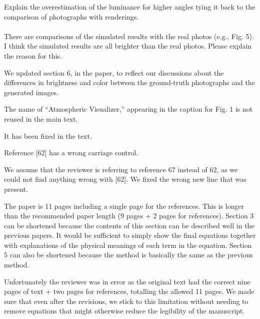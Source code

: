 \documentclass{article}
\begin{document}
\vspace*{1cm}
\begin{tcolorbox}
Explain the overestimation of the luminance for higher angles tying it back to the comparison of photographs with renderings.\\
\\
There are comparisons of the simulated results with the real photos (e.g., Fig. 5). I think the simulated results are all brighter than the real photos. Please explain the reason for this.
\end{tcolorbox}

We updated section 6, in the paper, to reflect our discussions about the differences in brightness and color between the ground-truth photographs and the generated images.

\vspace*{1cm}
\begin{tcolorbox}
The name of “Atmospheric Visualizer,” appearing in the caption for Fig. 1 is not reused in the main text.
\end{tcolorbox}

It has been fixed in the text.

\vspace*{1cm}
\begin{tcolorbox}
Reference [62] has a wrong carriage control.
\end{tcolorbox}

We assume that the reviewer is referring to reference 67 instead of 62, as we could not find anything wrong with [62]. We fixed the wrong new line that was present.

\vspace*{1cm}
\begin{tcolorbox}
The paper is 11 pages including a single page for the references. This is longer than the recommended paper length (9 pages + 2 pages for references). Section 3 can be shortened because the contents of this section can be described well in the previous papers. It would be sufficient to simply show the final equations together with explanations of the physical meanings of each term in the equation. Section 5 can also be shortened because the method is basically the same as the previous method.
\end{tcolorbox}

Unfortunately the reviewer was in error as the original text had the correct nine pages of text + two pages for references, totalling the allowed 11 pages.  We made sure that even after the revisions, we stick to this limitation without needing to remove equations that might otherwise reduce the legibility of the manuscript.
\end{document}
